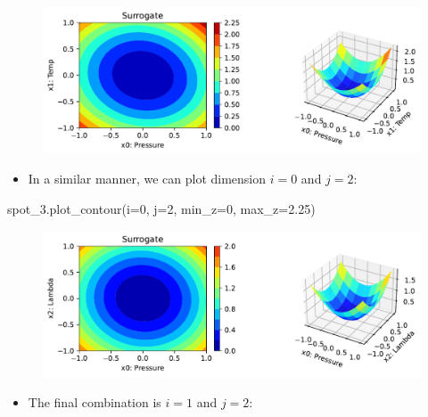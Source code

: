 \documentclass[
  letterpaper,
  DIV=11,
  numbers=noendperiod]{scrreprt}
\newenvironment{Shaded}{\begin{snugshade}}{\end{snugshade}}
\newcommand{\DecValTok}[1]{\textcolor[rgb]{0.68,0.00,0.00}{#1}}
\newcommand{\FloatTok}[1]{\textcolor[rgb]{0.68,0.00,0.00}{#1}}
\newcommand{\NormalTok}[1]{\textcolor[rgb]{0.00,0.23,0.31}{#1}}
\newcommand{\OperatorTok}[1]{\textcolor[rgb]{0.37,0.37,0.37}{#1}}
\providecommand{\tightlist}{%
  \setlength{\itemsep}{0pt}\setlength{\parskip}{0pt}}\usepackage{longtable,booktabs,array}
\begin{document}
\begin{figure}[H]

{\centering \includegraphics{02_spot_multidim_files/figure-pdf/cell-8-output-1.pdf}

}

\end{figure}

\begin{itemize}
\tightlist
\item
  In a similar manner, we can plot dimension \(i=0\) and \(j=2\):
\end{itemize}

\begin{Shaded}
\begin{Highlighting}[]
\NormalTok{spot\_3.plot\_contour(i}\OperatorTok{=}\DecValTok{0}\NormalTok{, j}\OperatorTok{=}\DecValTok{2}\NormalTok{, min\_z}\OperatorTok{=}\DecValTok{0}\NormalTok{, max\_z}\OperatorTok{=}\FloatTok{2.25}\NormalTok{)}
\end{Highlighting}
\end{Shaded}

\begin{figure}[H]

{\centering \includegraphics{02_spot_multidim_files/figure-pdf/cell-9-output-1.pdf}

}

\end{figure}

\begin{itemize}
\tightlist
\item
  The final combination is \(i=1\) and \(j=2\):
\end{itemize}
\end{document}
